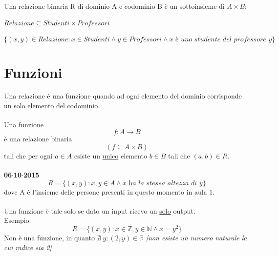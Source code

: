 \documentclass[italian]{article}
\begin{document}
Una relazione binaria R di dominio A e codominio B è un sottoinsieme di $A\times B$:
\begin{center}
	$Relazione\subseteq Studenti \times Professori$
\end{center}

$\{(x,y)\in Relazione : x \in Studenti \land y \in Professori \land \textit{x è uno studente del professore y}\}$ \\ 
\pagebreak
\section{Funzioni}
Una relazione è una funzione quando ad ogni elemento del dominio corrisponde un solo elemento del codominio.\\ \\
Una funzione
\[f: A\rightarrow B\]
è una relazione binaria
\[(f\subseteq A\times B)\]
tali che per ogni $a\in A$ esiste un \underline{unico} elemento $b\in B$ tali che $(a,b)\in R$.\\\\
\textbf{06$\cdot$10$\cdot$2015}
\[R=\{(x,y):x,y\in A \land \textit{x ha la stessa altezza di y}\}\]
dove A è l'insieme delle persone presenti in questo momento in aula 1.\\ \\
Una funzione è tale solo se dato un input ricevo un \underline{solo} output.\\
Esempio:
\[
	R=\{(x,y):x\in \mathbb{Z}, y\in \mathbb{N} \land x=y^2\}
\]
Non è una funzione, in quanto $\nexists \; y : (2,y)\in \mathbb{R}$ \emph{[non esiste un numero naturale la cui radice sia 2]} \\
\end{document}
